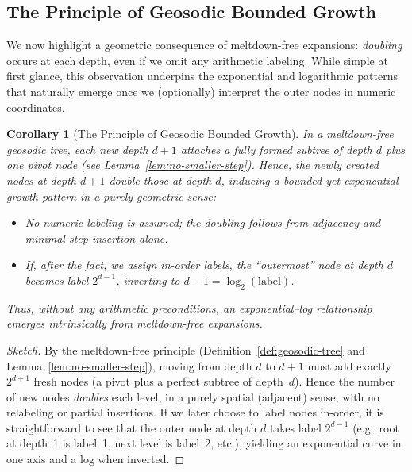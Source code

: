 \documentclass[11pt]{article}
\newtheorem{corollary}[theorem]{Corollary}
\theoremstyle{definition}
\theoremstyle{remark}
\begin{document}
 \subsection{The Principle of Geosodic Bounded Growth}
\label{subsec:bounded-growth}

We now highlight a geometric consequence of meltdown-free expansions:
\emph{doubling} occurs at each depth, even if we omit any arithmetic labeling.
While simple at first glance, this observation underpins the exponential
and logarithmic patterns that naturally emerge once we (optionally) interpret
the outer nodes in numeric coordinates.

\begin{corollary}[The Principle of Geosodic Bounded Growth]
\label{cor:geosodic-bounded-growth}
In a meltdown-free geosodic tree, each new depth $d+1$ attaches a fully formed
subtree of depth $d$ plus one pivot node (see Lemma~\ref{lem:no-smaller-step}).
Hence, the newly created nodes at depth $d+1$ \emph{double} those at depth $d$,
inducing a bounded-yet-exponential growth pattern in a purely \emph{geometric} sense:

\begin{itemize}
  \item No numeric labeling is assumed; the doubling follows from adjacency
  and minimal-step insertion alone.
  \item If, \emph{after the fact}, we assign in-order labels, the ``outermost''
  node at depth $d$ becomes label $2^{d-1}$, inverting to $d-1 = \log_2(\text{label})$.
\end{itemize}

Thus, without any arithmetic preconditions, an exponential--log relationship
emerges \emph{intrinsically} from meltdown-free expansions.
\end{corollary}

\begin{proof}[Sketch]
By the meltdown-free principle (Definition~\ref{def:geosodic-tree} and
Lemma~\ref{lem:no-smaller-step}), moving from depth $d$ to $d+1$ must
add exactly $2^{d+1}$ fresh nodes (a pivot plus a perfect subtree of depth~$d$).
Hence the number of new nodes \emph{doubles} each level, in a purely spatial
(adjacent) sense, with no relabeling or partial insertions.
If we later choose to label nodes in-order, it is straightforward
to see that the outer node at depth $d$ takes label $2^{d-1}$ (e.g.\ 
root at depth~1 is label~1, next level is label~2, etc.), yielding an
exponential curve in one axis and a log when inverted.
\end{proof}
\end{document}
